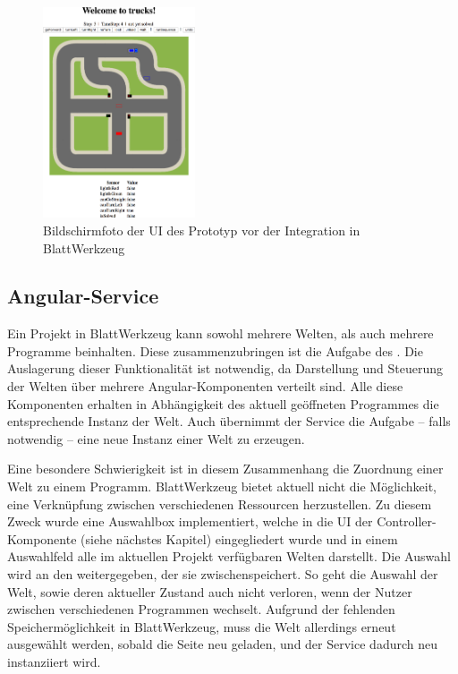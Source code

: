 \begin{figure}
  \centering
  \includegraphics[width=0.4\textwidth]{gfx/implementation-integration-prototype.png}
  \caption{Bildschirmfoto der UI des Prototyp vor der Integration in BlattWerkzeug}
  \label{fig:implementation:integration:prototype}
\end{figure}

\subsection{Angular-Service}
\label{sec:implementation:integration:ng-service}

Ein Projekt in BlattWerkzeug kann sowohl mehrere Welten, als auch mehrere Programme beinhalten. Diese zusammenzubringen ist die Aufgabe des . Die Auslagerung dieser Funktionalität ist notwendig, da Darstellung und Steuerung der Welten über mehrere Angular-Komponenten verteilt sind. Alle diese Komponenten erhalten in Abhängigkeit des aktuell geöffneten Programmes die entsprechende Instanz der Welt. Auch übernimmt der Service die Aufgabe -- falls notwendig -- eine neue Instanz einer Welt zu erzeugen.

Eine besondere Schwierigkeit ist in diesem Zusammenhang die Zuordnung einer Welt zu einem Programm. BlattWerkzeug bietet aktuell nicht die Möglichkeit, eine Verknüpfung zwischen verschiedenen Ressourcen herzustellen. Zu diesem Zweck wurde eine Auswahlbox implementiert, welche in die UI der Controller-Komponente (siehe nächstes Kapitel) eingegliedert wurde und in einem Auswahlfeld alle im aktuellen Projekt verfügbaren Welten darstellt. Die Auswahl wird an den  weitergegeben, der sie zwischenspeichert. So geht die Auswahl der Welt, sowie deren aktueller Zustand auch nicht verloren, wenn der Nutzer zwischen verschiedenen Programmen wechselt. Aufgrund der fehlenden Speichermöglichkeit in BlattWerkzeug, muss die Welt allerdings erneut ausgewählt werden, sobald die Seite neu geladen, und der Service dadurch neu instanziiert wird.

